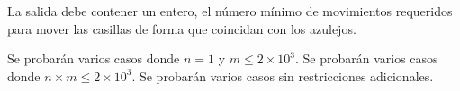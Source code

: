 \documentclass{oci}
\begin{document}
\begin{outputDescription}
La salida debe contener un entero, el número mínimo de movimientos
requeridos para mover las casillas de forma que coincidan con
los azulejos.
\end{outputDescription}

\begin{scoreDescription}
   Se probarán varios casos donde $n=1$ y $m\leq 2\times 10^3$.
   Se probarán varios casos donde $n\times m \leq 2\times 10^3$.
   Se probarán varios casos sin restricciones adicionales.
\end{scoreDescription}

\begin{sampleDescription}
\end{sampleDescription}
\end{document}
